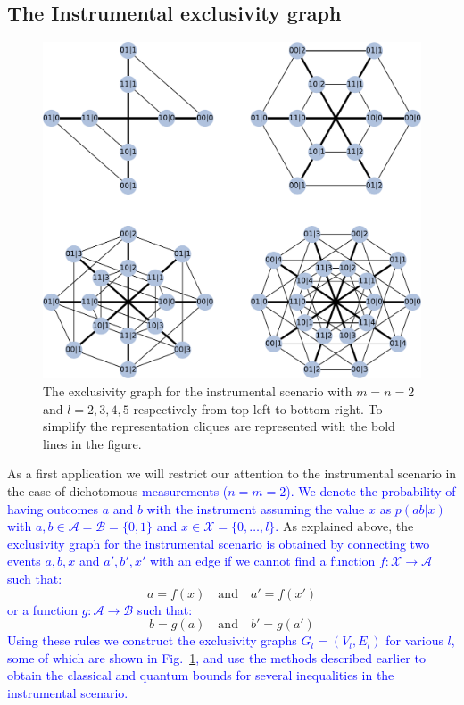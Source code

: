\documentclass[letterpaper]{article}
\begin{document}
\subsection{The Instrumental exclusivity graph}
\begin{figure}[t]
    \centering
    \includegraphics[width=\columnwidth]{images/instrumental_exgraph.pdf}
    \caption{
    The exclusivity graph for the instrumental scenario with $m = n =2$ and $l=2,3,4,5$
    respectively from top left to bottom right. 
    To simplify the representation cliques are represented with the bold lines
    in the figure.}
    \label{fig:instrumental_exgraphs}
\end{figure}

As a first application we will restrict our attention to the instrumental
scenario in the case of dichotomous \textcolor{blue}{measurements ($n = m = 2$).
We denote the probability of having outcomes $a$ and $b$ with the
instrument assuming the value $x$ as $p(ab|x)$ with $a, b \in \mathcal{A}
= \mathcal{B} = \{0,1\}$ and $x \in \mathcal{X} = \{0,\ldots,l\}$.}
As explained above, the 
\textcolor{blue}{exclusivity graph for the instrumental scenario is obtained by
connecting two events $a,b,x$ and $a',b',x'$ with an edge if we cannot find a function
$f:\mathcal{X} \rightarrow \mathcal{A}$ such that:
}
\begin{equation}
    a = f(x) \quad\text{and}\quad a'=f(x')
\end{equation}
\textcolor{blue}{
or a function $g:\mathcal{A} \rightarrow \mathcal{B}$ such that:
}
\begin{equation}
     b = g(a) \quad\text{and}\quad b'=g(a')
    \label{eq:non_exclusivity_condition}
\end{equation}
\textcolor{blue}{Using these rules we construct the exclusivity
graphs $G_l = (V_l, E_l)$ for various $l$, some of which are shown in
Fig.~\ref{fig:instrumental_exgraphs}, and use the methods described
earlier to obtain the classical and quantum bounds for several
inequalities in the instrumental scenario.
}
\end{document}
